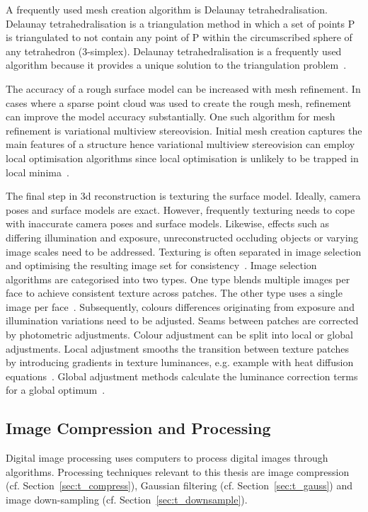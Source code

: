 A frequently used mesh creation algorithm is Delaunay tetrahedralisation. Delaunay tetrahedralisation is a triangulation method in which a set of points \gls{P} is triangulated to not contain any point of \gls{P} within the circumscribed sphere of any tetrahedron (3-simplex). Delaunay tetrahedralisation is a frequently used algorithm because it provides a unique solution to the triangulation problem~\cite{vu2012high}.

The accuracy of a rough surface model can be increased with mesh refinement. In cases where a sparse point cloud was used to create the rough mesh, refinement can improve the model accuracy substantially. One such algorithm for mesh refinement is variational multiview stereovision. Initial mesh creation captures the main features of a structure hence variational multiview stereovision can employ local optimisation algorithms since local optimisation is unlikely to be trapped in local minima~\cite{Faugeras1998VariationalProblem, vu2012high}.

The final step in \gls{3d} reconstruction is texturing the surface model. Ideally, camera poses and surface models are exact. However, frequently texturing needs to cope with inaccurate camera poses and surface models. Likewise, effects such as differing illumination and exposure, unreconstructed occluding objects or varying image scales need to be addressed. Texturing is often separated in image selection and optimising the resulting image set for consistency~\cite{Waechter2014LetReconstructions}. Image selection algorithms are categorised into two types. One type blends multiple images per face to achieve consistent texture across patches. The other type uses a single image per face~\cite{Waechter2014LetReconstructions}.
Subsequently, colours differences originating from exposure and illumination variations need to be adjusted. Seams between patches are corrected by photometric adjustments. Colour adjustment can be split into local or global adjustments. Local adjustment smooths the transition between texture patches by introducing gradients in texture luminances, e.g. example with heat diffusion equations~\cite{Velho2007ProjectivePhotography}. Global adjustment methods calculate the luminance correction terms for a global optimum~\cite{Lempitsky2007SeamlessMaps}.

\subsection{Image Compression and Processing}
Digital image processing uses computers to process digital images through algorithms. Processing techniques relevant to this thesis are image compression (cf. Section~\ref{sec:t_compress}), Gaussian filtering  (cf. Section~\ref{sec:t_gauss}) and image down-sampling  (cf. Section~\ref{sec:t_downsample}).

